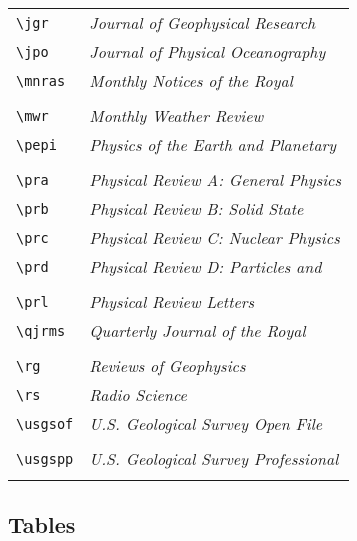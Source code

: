 \begin{center}
\begin{tabular}{ll}
\verb"\jgr"    & {\it Journal of Geophysical Research}\\
\verb"\jpo"    & {\it Journal of Physical Oceanography}\\
\verb"\mnras"  & {\it Monthly Notices of the Royal}\\
               & \hspace{2em}{\it Astronomical Society}\\
\verb"\mwr"    & {\it Monthly Weather Review}\\
\verb"\pepi"   & {\it Physics of the Earth and Planetary}\\
               & \hspace{2em}{\it Interiors}\\
\verb"\pra"    & {\it Physical Review A: General Physics}\\
\verb"\prb"    & {\it Physical Review B: Solid State}\\
\verb"\prc"    & {\it Physical Review C: Nuclear Physics}\\
\verb"\prd"    & {\it Physical Review D: Particles and}\\
               & \hspace{2em}{\it Fields}\\
\verb"\prl"    & {\it Physical Review Letters}\\
\verb"\qjrms"  & {\it Quarterly Journal of the Royal}\\
               & \hspace{2em}{\it Meteorological Society}\\
\verb"\rg"     & {\it Reviews of Geophysics}\\
\verb"\rs"     & {\it Radio Science}\\
\verb"\usgsof" & {\it U.S. Geological Survey Open File}\\
               & \hspace{2em}{\it Report }\\
\verb"\usgspp" & {\it U.S. Geological Survey Professional}\\
               & \hspace{2em}{\it Papers}\\
\end{tabular}
\end{center}

\clearpage

\subsection{Tables}

